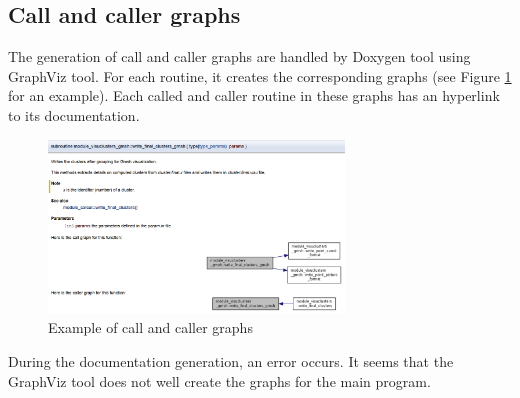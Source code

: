 \subsection{Call and caller graphs}
The generation of call and caller graphs are handled by Doxygen tool using GraphViz tool. For each routine, it creates the corresponding graphs (see Figure \ref{graph} for an example). Each called and caller routine in these graphs has an hyperlink to its documentation.\\
\begin{figure}[h!]
\includegraphics[width=0.7\textwidth]{Image/docu-graphs}\centering
\caption{Example of call and caller graphs\label{graph}}
\end{figure}

During the documentation generation, an error occurs. It seems that the GraphViz tool does not well create the graphs for the main program.